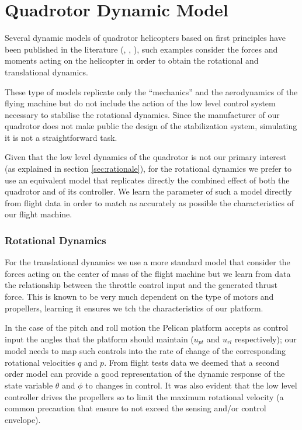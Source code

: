 \documentclass[a4paper,11pt]{report}
\begin{document}
\section{Quadrotor Dynamic Model}

Several dynamic models of quadrotor helicopters based on first principles have been published in the literature (\cite{bouabdallah07phd}, \cite{balas07modelling}, \cite{hoffmann07quadrotor}), such examples consider the forces and moments acting on the helicopter in order to obtain the rotational and translational dynamics.

These type of models replicate only the ``mechanics'' and the aerodynamics of the flying machine but do not include the action of the low level control system necessary to stabilise the rotational dynamics. Since the manufacturer of our quadrotor does not make public the design of the stabilization system, simulating it is not a straightforward task. 

Given that the low level dynamics of the quadrotor is not our primary interest (as explained in section \ref{sec:rationale}), for the rotational dynamics we prefer to use an equivalent  model that replicates directly the combined effect of both the quadrotor and of its controller.
We learn the parameter of such a model directly from flight data in order to match as accurately as possible the characteristics of our flight machine.

\subsubsection{Rotational Dynamics}
For the translational dynamics we use a more standard model that consider the forces acting on the center of mass of the flight machine but we learn from data the relationship between the throttle control input and the generated thrust force. This is known to be very much dependent on the type of motors and propellers, learning it ensures we tch the characteristics of our platform.

In the case of the pitch and roll motion the Pelican platform accepts as control input the angles that the platform should maintain ($u_{pt}$ and $u_{rl}$ respectively); our model needs to map such controls into the rate of change of the corresponding rotational velocities $q$ and $p$. 
From flight tests data we deemed that a second order model can provide a good representation of the dynamic response of the state variable $\theta$ and $\phi$ to changes in control. It was also evident that the low level controller drives the propellers so to limit the maximum rotational velocity (a common precaution that ensure to not exceed the sensing and/or control envelope). 
\end{document}

